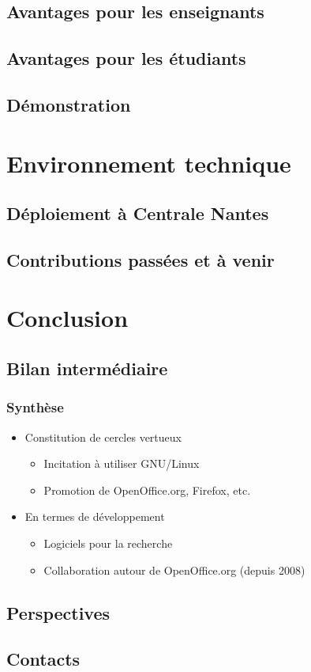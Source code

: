 \documentclass[hyperref,french,usenames,xcolor=dvipsnames]{beamer}
\begin{document}

\subsection*{Avantages pour les enseignants}

\subsection*{Avantages pour les étudiants}

\subsection*{Démonstration}

\section*{Environnement technique}

\subsection*{Déploiement à Centrale Nantes}

\subsection*{Contributions passées et à venir}

\section*{Conclusion}

\subsection*{Bilan intermédiaire}

\frame
{
  \frametitle{Synthèse}
  
\begin{itemize}
\item Constitution de cercles vertueux
\begin{itemize}  
\item Incitation à utiliser GNU/Linux 
\item Promotion de OpenOffice.org, Firefox, etc. 
\end{itemize}
\item En termes de développement 
\begin{itemize} 
\item Logiciels pour la recherche
\item Collaboration autour de OpenOffice.org (depuis 2008) 
\end{itemize}
\end{itemize}
}

\subsection*{Perspectives}

\subsection*{Contacts}

%
%
\end{document}
